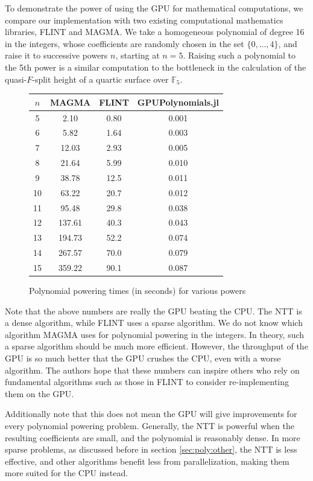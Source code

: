 \documentclass[a4paper]{article}
\theoremstyle{definition}
\theoremstyle{remark}
\begin{document}
To demonstrate the power of using the GPU for mathematical computations, 
we compare our implementation
with two existing computational mathematics libraries, FLINT
and MAGMA.
We take a homogeneous polynomial of degree 16 in the integers,
whose coefficients are randomly chosen in the set 
\(\{0, \ldots, 4\}\), and raise it to successive powers \(n\),
starting at \(n=5\).
Raising such a polynomial to the 5th power is a similar 
computation to the bottleneck in the calculation of the
quasi-\(F\)-split height of a quartic surface over \(\mathbb{F}_{5}\).

\begin{figure}[h]
\begin{center}
\begin{tabular}{c c c c}
    \toprule
    \(n\) & MAGMA & FLINT & GPUPolynomials.jl \\
    \midrule
    5 & 2.10 &    0.80 & 0.001 \\
    6 & 5.82 &    1.64 & 0.003 \\
    7 & 12.03 &   2.93 & 0.005 \\
    8 & 21.64 &   5.99 & 0.010 \\
    9 & 38.78 &   12.5 & 0.011 \\
    10 & 63.22 &  20.7 & 0.012 \\
    11 & 95.48 &  29.8 & 0.038 \\
    12 & 137.61 & 40.3 & 0.043 \\
    13 & 194.73 & 52.2 & 0.074 \\
    14 & 267.57 & 70.0 & 0.079 \\
    15 & 359.22 & 90.1 & 0.087 \\
    \bottomrule
\end{tabular}
\caption{Polynomial powering times (in seconds) for various powers}
\end{center}
\end{figure}

Note that the above numbers are really the GPU beating the CPU.
The NTT is a dense algorithm, while FLINT uses a sparse algorithm.
We do not know which algorithm MAGMA uses for polynomial powering
in the integers.
In theory, such a sparse algorithm should
be much more efficient.
However, the throughput of the GPU is so much better that the
GPU crushes the CPU, even with a worse algorithm.
The authors hope that these numbers can inspire others who
rely on fundamental algorithms such as those in FLINT to 
consider re-implementing them on the GPU.

Additionally note that this does not mean the GPU will give 
improvements for every polynomial powering 
problem. Generally, the NTT is powerful when the resulting 
coefficients are small, and the polynomial is reasonably dense. 
In more sparse problems, as discussed before in section \ref{sec:poly:other}, 
the NTT is less effective, and other algorithms benefit less 
from parallelization, making them more 
suited for the CPU instead.
\end{document}
